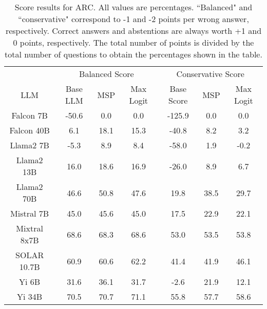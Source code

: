 \renewcommand\arraystretch{1.2}
\begin{table*}
\centering
\begin{tabular}{c|c|c|c|c|c|c}
& \multicolumn{3}{c|}{Balanced Score} & \multicolumn{3}{c}{Conservative Score} \\ 
LLM & Base LLM & MSP & Max Logit & Base Score & MSP & Max Logit\\ \hline
Falcon 7B & -50.6 & 0.0 & 0.0 & -125.9 & 0.0 & 0.0\\
Falcon 40B & 6.1 & 18.1 & 15.3 & -40.8 & 8.2 & 3.2\\
Llama2 7B & -5.3 & 8.9 & 8.4 & -58.0 & 1.9 & -0.2\\
Llama2 13B & 16.0 & 18.6 & 16.9 & -26.0 & 8.9 & 6.7\\
Llama2 70B & 46.6 & 50.8 & 47.6 & 19.8 & 38.5 & 29.7\\
Mistral 7B & 45.0 & 45.6 & 45.0 & 17.5 & 22.9 & 22.1\\
Mixtral 8x7B & 68.6 & 68.3 & 68.6 & 53.0 & 53.5 & 53.8\\
SOLAR 10.7B & 60.9 & 60.6 & 62.2 & 41.4 & 41.9 & 46.1\\
Yi 6B & 31.6 & 36.1 & 31.7 & -2.6 & 21.9 & 12.1\\
Yi 34B & 70.5 & 70.7 & 71.1 & 55.8 & 57.7 & 58.6\\
\hline
\end{tabular}
\caption{Score results for ARC. All values are percentages. ``Balanced" and ``conservative" correspond to -1 and -2 points per wrong answer, respectively. Correct answers and abstentions are always worth +1 and 0 points, respectively. The total number of points is divided by the total number of questions to obtain the percentages shown in the table.}
\label{tab:arc_score}
\end{table*}
